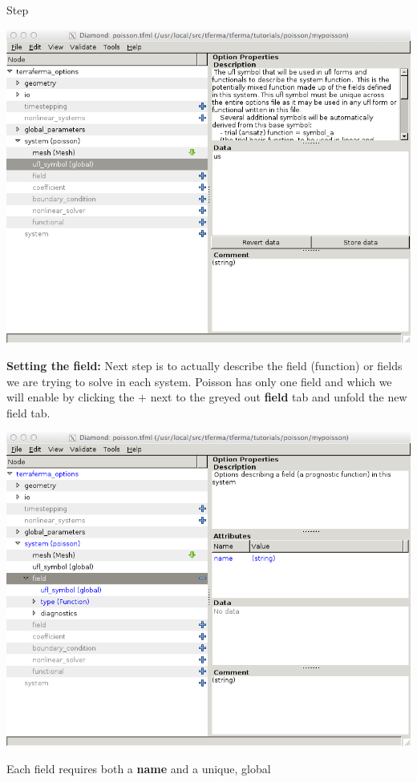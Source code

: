\begin{steps}{Step}
\begin{center}
    \includegraphics[width=\diamondwidth]{figures/screendumps/diamond_poisson_05c.png}
\end{center}
\item \textbf{Setting the field:} Next step is to actually describe
  the field (function) or fields we are trying to solve in each
  system.  Poisson has only one field and which we will enable by
  clicking the $+$ next to the greyed out \textbf{field} tab and
  unfold the new field tab.
\begin{center}
    \includegraphics[width=\diamondwidth]{figures/screendumps/diamond_poisson_06a.png}
\end{center}
Each field requires both a \textbf{name} and a unique, global

\end{steps}
